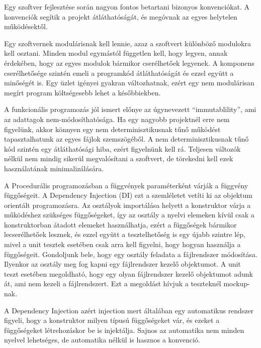 \documentclass[a4paper,12pt,oneside]{report}
\begin{document}
\begin{justify}

	Egy szoftver fejlesztése során nagyon fontos betartani bizonyos konvenciókat. A konvenciók segítik a projekt átláthatóságát, és megóvnak az egyes helytelen működésektől. \cite{website:coding_standards_matter} 

	Egy szoftvernek modulárisnak kell lennie, azaz a szoftvert különböző modulokra kell osztani. Minden modul egymástól független kell, hogy legyen, annak érdekében, hogy az egyes modulok bármikor cserélhetőek legyenek. A komponens cserélhetősége szintén emeli a programkód átláthatóságát és ezzel együtt a minőségét is. Egy üzlet igényei gyakran változhatnak, ezért egy nem modulárisan megírt program költségesebb lehet a későbbiekben. \cite{book:replace_component}

	A funkcionális programozás jól ismert előnye az úgynevezett “immutablility”, ami az adattagok nem-módosíthatósága. Ha egy nagyobb projektnél erre nem figyelünk, akkor könnyen egy nem determinisztikusnak tűnő működést tapasztalhatunk az egyes fájlok szemszögéből. A nem determinisztikusnak tűnő kód szintén egy átláthatósági hiba, ezért figyelnünk kell rá. Teljesen változók nélkül nem mindig sikerül megvalósítani a szoftvert, de törekedni kell ezek használatának minimalizálására. 

	A Procedurális programozásban a függvények paraméterként várják a függvény függőségeit. A Dependency Injection (DI) ezt a szemléletet vetíti ki az objektum orientált programozásra. Az osztályok importálása helyett a konstruktor várja a működéshez szükséges függőségeket, így az osztály a nyelvi elemeken kívül csak a konstruktorban átadott elemeket használhatja, ezért a függőségek bármikor lecserélhetőek lesznek, és ezzel együtt a tesztelhetőség is egy újabb szintre lép, mivel a unit tesztek esetében csak arra kell figyelni, hogy hogyan használja a függőségeit. \cite{website:dependency_injection, website:dependency_injection_procedural} Gondoljunk bele, hogy egy osztály feladata a fájlrendszer módosítása. Ilyenkor az osztály meg fog kapni egy fájlrendszer kezelő objektumot. A unit teszt esetében megoldható, hogy egy olyan fájlrendszer kezelő objektumot adunk át, ami nem kezeli a fájlrendszert. Ezt a megoldást hívjuk a teszteknél mockup-nak. 

	A Dependency Injection azért injection mert általában egy automatikus rendszer figyeli, hogy a konstruktor milyen típusú függőségeket vár, és ezeket a függőségeket létrehozáskor be is injektálja. Sajnos az automatika nem minden nyelvel lehetséges, de automatika nélkül is hasznos a konvenció. \cite{website:dependency_injection_without_container}


\end{justify}
\end{document}
